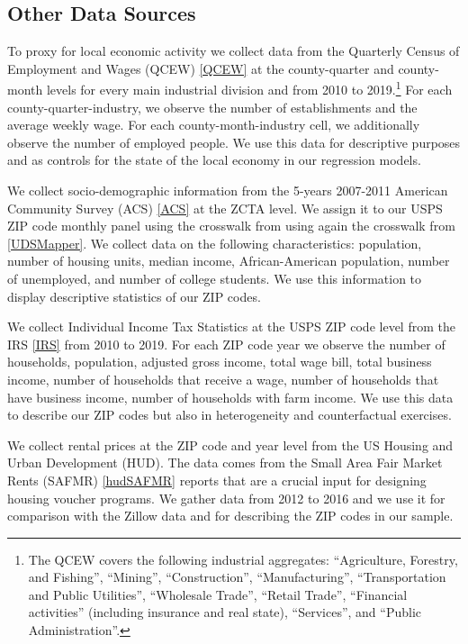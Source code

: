 \subsection{Other Data Sources}\label{sec:data/other_data}

To proxy for local economic activity we collect data from the Quarterly Census of 
Employment and Wages (QCEW) \ref{QCEW} at the county-quarter and county-month levels 
for every main industrial division and from 2010 to 2019.\footnote{The QCEW covers the 
	following industrial aggregates: 
	``Agriculture, Forestry, and Fishing'', ``Mining'', ``Construction'', ``Manufacturing'', 
	``Transportation and Public Utilities'', ``Wholesale Trade'', ``Retail Trade'',
	``Financial activities'' (including insurance and real state), ``Services'', and 
	``Public Administration''.}
For each county-quarter-industry, we observe the number of establishments and the 
average weekly wage. For each county-month-industry cell, we additionally observe the number 
of employed people. We use this data for descriptive purposes and as controls for the 
state of the local economy in our regression models. 

We collect socio-demographic information from the 5-years 2007-2011 American Community 
Survey (ACS) \ref{ACS} at the ZCTA level. We assign it to our USPS ZIP code monthly panel using
the crosswalk from using again the crosswalk from \ref{UDSMapper}.
We collect data on the following characteristics: population, number of housing units, 
median income, African-American population, number of unemployed, and number of college 
students. We use this information to display descriptive statistics of our ZIP codes.

We collect Individual Income Tax Statistics at the USPS ZIP code level from the IRS \ref{IRS} 
from 2010 to 2019. For each ZIP code year we observe the number of households, population,
adjusted gross income, total wage bill, total business income, number of households that receive 
a wage, number of households that have business income, number of households with farm income. 
We use this data to describe our ZIP codes but also in heterogeneity and counterfactual exercises.

We collect rental prices at the ZIP code and year level from the US Housing and Urban 
Development (HUD). The data comes from the Small Area Fair Market Rents (SAFMR) \ref{hudSAFMR} 
reports that are a crucial input for designing housing voucher programs. We gather data 
from 2012 to 2016 and we use it for comparison with the Zillow data and for describing 
the ZIP codes in our sample. 

